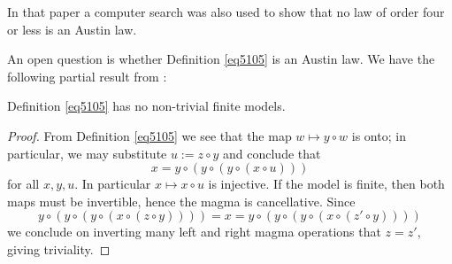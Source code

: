 In that paper a computer search was also used to show that no law of order four or less is an Austin law.

An open question is whether Definition \ref{eq5105} is an Austin law.  We have the following partial result from \cite{Kisielewicz2}:

\begin{theorem}\label{5105-nontrivial} Definition \ref{eq5105} has no non-trivial finite models.
\end{theorem}

\begin{proof} From Definition \ref{eq5105} we see that the map $w \mapsto y \circ w$ is onto; in particular, we may substitute $u := z \circ y$ and conclude that
$$  x = y \circ (y \circ (y \circ (x \circ u)))$$
for all $x,y,u$.  In particular $x \mapsto x \circ u$ is injective.  If the model is finite, then both maps must be invertible, hence the magma is cancellative.  Since
$$ y \circ (y \circ (y \circ (x \circ (z \circ y)))) = x = y \circ (y \circ (y \circ (x \circ (z' \circ y))))$$
we conclude on inverting many left and right magma operations that $z = z'$, giving triviality.
\end{proof}
